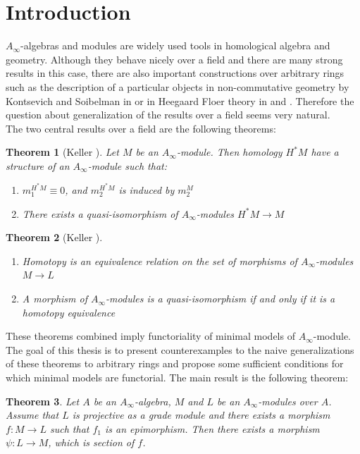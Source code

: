 \documentclass[a4paper, 12pt, openany, fleqn]{amsart}
\newtheorem{theorem}{Theorem}[section]
\begin{document}
\section{Introduction}
$A_\infty$-algebras and modules are widely used tools in homological algebra and geometry. Although they behave nicely over a field and there are many strong results in this case, there are also important constructions over arbitrary rings such as the description of a particular objects in non-commutative geometry by Kontsevich and Soibelman in \cite{MR2596638} or in Heegaard Floer theory in \cite{MR3827056} and \cite{MR4905538}. Therefore the question about generalization of the results over a field seems very natural.\\
The two central results over a field are the following theorems:
    \begin{theorem}[Keller \cite{MR1854636}]
    Let $M$ be an $A_\infty$-module. Then homology $H^*M$ have a structure of an $A_\infty$-module such that:
    \begin{enumerate}
        \item $m_1^{H^*M}\equiv0$, and $m_2^{H^*M}$ is induced by $m_2^M$
        \item There exists a quasi-isomorphism of $A_\infty$-modules $H^*M\longrightarrow M$
    \end{enumerate}
\end{theorem}
\begin{theorem}[Keller \cite{MR1854636}]
    \begin{enumerate}
        \item Homotopy is an equivalence relation on the set of morphisms of $A_\infty$-modules $M\longrightarrow L$
        \item A morphism of $A_\infty$-modules is a quasi-isomorphism if and only if it is a homotopy equivalence
    \end{enumerate}
\end{theorem}
These theorems combined imply functoriality of minimal models of $A_\infty$-module. The goal of this thesis is to present counterexamples to the naive generalizations of these theorems to arbitrary rings and propose some sufficient conditions for which minimal models are functorial. The main result is the following theorem:
\begin{theorem}
    Let $A$ be an $A_\infty$-algebra, $M$ and $L$ be an $A_\infty$-modules over $A$. Assume that $L$ is projective as a grade module and there exists a morphism $f:M\longrightarrow L$ such that $f_1$ is an epimorphism. Then there exists a morphism $\psi :L\longrightarrow M$, which is section of $f$.
\end{theorem}
\end{document}
